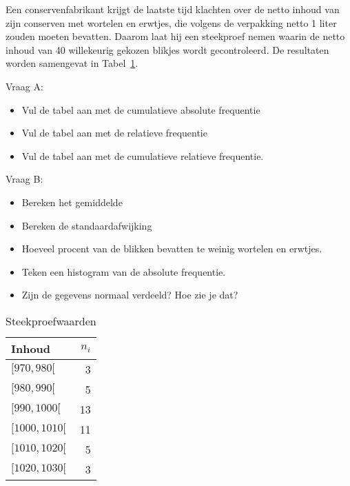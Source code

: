 \begin{exercise}
  Een conservenfabrikant krijgt de laatste tijd klachten over de netto inhoud van zijn conserven met wortelen en erwtjes, die volgens de verpakking netto 1 liter zouden moeten bevatten. Daarom laat hij een steekproef nemen waarin de netto inhoud van 40 willekeurig gekozen blikjes wordt gecontroleerd. De resultaten worden samengevat in Tabel~\ref{tab:Steekproefwaarden}.

Vraag A:
\begin{itemize}
  \item Vul de tabel aan met de cumulatieve absolute frequentie
  \item Vul de tabel aan met de relatieve frequentie
  \item Vul de tabel aan met de cumulatieve relatieve frequentie.
\end{itemize}
Vraag B:

\begin{itemize}
  \item Bereken het gemiddelde
  \item Bereken de standaardafwijking
  \item Hoeveel procent van de blikken bevatten te weinig wortelen en erwtjes.
  \item Teken een histogram van de absolute frequentie.
  \item Zijn de gegevens normaal verdeeld?  Hoe zie je dat?
\end{itemize}

\end{exercise}

  \begin{table}
  \centering
  \begin{tabular}{lr}
    \toprule
    Inhoud & $n_{i}$ \\
    \midrule
    $[970,980[$ & 3 \\
    $[980,990[$ & 5 \\
    $[990,1000[$ & 13 \\
    $[1000,1010[$ & 11 \\
    $[1010,1020[$ & 5 \\
    $[1020,1030[$ & 3 \\
    \bottomrule
  \end{tabular}
  \caption{Steekproefwaarden}
  \label{tab:Steekproefwaarden}
\end{table}

